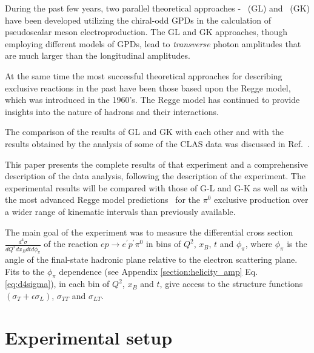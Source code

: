 \documentclass[prc,floatfix,twocolumn,superscriptaddress,letter]{revtex4}
\begin{document}
During the past few years, two parallel theoretical approaches - \cite{Ahmad:2008hp, 
Goldstein:2010gu}~(GL) and \cite{G-K-09,G-K-11}~(GK) have been developed utilizing the  chiral-odd GPDs in the calculation of  pseudoscalar meson electroproduction. The GL and GK approaches, though employing different models of  GPDs, lead to {\it transverse} photon amplitudes that are much larger than the longitudinal amplitudes.

At the same time the most successful theoretical approaches for describing exclusive reactions in the past have been those based upon the  Regge  model, which was introduced in the 1960's. The  Regge model  \cite{Laget}  has continued to provide  insights into the nature of hadrons and their interactions. 

The comparison of the results of GL and GK with each other and with the results obtained by the analysis of some of the CLAS data was discussed in Ref.~\cite{bedlinskiy}. 

This paper presents  the complete results of  that experiment and a comprehensive description of the data analysis,  following the description of the experiment.  The experimental results  will  be compared with those of G-L  and G-K as well as  with the most advanced Regge model predictions~\cite{Laget} for the $\pi^0$ exclusive production over a wider range of kinematic intervals than previously available.

The main goal of the experiment was to measure the  differential cross section 
 $\frac {d^4\sigma}    {dQ^2 dx_B dt d\phi_\pi}$ of the reaction
$ep\to e^\prime p^\prime \pi^0$ in bins of $Q^2$, $x_B$, $t$ and $\phi_\pi$, where $\phi_\pi$ is the angle of the final-state hadronic plane relative to the electron scattering plane. 
Fits to the  $\phi_\pi$ dependence (see Appendix \ref{section:helicity_amp}
 Eq. \ref{eq:d4sigma}), in each bin of $Q^2$, $x_B$ and $t$, give access to the structure functions  $(\sigma_T+\epsilon \sigma_L)$, $\sigma_{TT}$ and $\sigma_{LT}$.




\section{Experimental setup}
\end{document}
